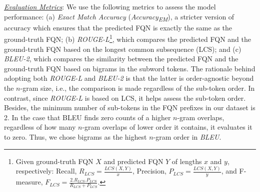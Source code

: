 \noindent\underline{\textit{Evaluation Metrics}}: We use the following metrics to assess the model performance: (a) \textit{Exact Match Accuracy} ({\em Accuracy\textsubscript{EM}}), a stricter version of accuracy which ensures that the predicted FQN is exactly the same as the ground-truth FQN; (b) \textit{ROUGE-L}\footnote{Given ground-truth FQN $X$ and predicted FQN $Y$ of lengths $x$ and $y$, respectively: Recall, $R_{LCS}=\frac{LCS(X, Y)}{x}$, Precision, $P_{LCS}=\frac{LCS(X, Y)}{y}$, and F-measure, $F_{LCS}=\frac{2.R_{LCS}.P_{LCS}}{R_{LCS}+P_{LCS}}$.}, which compares the predicted FQN and the ground-truth FQN based on the longest common subsequence (LCS); and (c) \textit{BLEU-2}, which compares the similarity between the predicted FQN and the ground-truth FQN based on bigrams in the subword tokens.
The rationale behind adopting both \textit{ROUGE-L} and \textit{BLEU-2} is that the latter is order-agnostic beyond the $n$-gram size, i.e., the comparison is made regardless of the sub-token order. In contrast, since \textit{ROUGE-L} is based on LCS, it helps assess the sub-token order. Besides, the minimum number of sub-tokens in the FQN prefixes in our dataset is 2. In the case that BLEU finds zero counts of a higher $n$-gram overlaps, regardless of how many $n$-gram overlaps of lower order it contains, it evaluates it to zero. Thus, we chose bigrams as the highest $n$-gram order in \textit{BLEU}.


